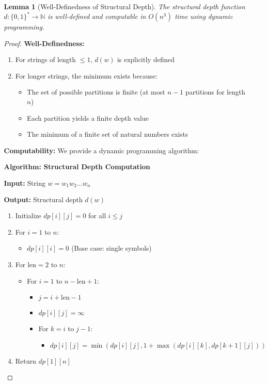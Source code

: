 \documentclass[11pt]{article}
\newtheorem{lemma}[theorem]{Lemma}
\theoremstyle{definition}
\begin{document}
\begin{lemma}[Well-Definedness of Structural Depth]
The structural depth function $d: \{0,1\}^* \to \mathbb{N}$ is well-defined and computable in $O(n^3)$ time using dynamic programming.
\end{lemma}

\begin{proof}
\textbf{Well-Definedness:}
\begin{enumerate}
\item For strings of length $\leq 1$, $d(w)$ is explicitly defined
\item For longer strings, the minimum exists because:
  \begin{itemize}
  \item The set of possible partitions is finite (at most $n-1$ partitions for length $n$)
  \item Each partition yields a finite depth value
  \item The minimum of a finite set of natural numbers exists
  \end{itemize}
\end{enumerate}

\textbf{Computability:}
We provide a dynamic programming algorithm:

\textbf{Algorithm: Structural Depth Computation}

\textbf{Input:} String $w = w_1w_2\ldots w_n$

\textbf{Output:} Structural depth $d(w)$

\begin{enumerate}
\item Initialize $dp[i][j] = 0$ for all $i \leq j$
\item For $i = 1$ to $n$:
   \begin{itemize}
   \item $dp[i][i] = 0$ (Base case: single symbols)
   \end{itemize}
\item For $\text{len} = 2$ to $n$:
   \begin{itemize}
   \item For $i = 1$ to $n-\text{len}+1$:
      \begin{itemize}
      \item $j = i + \text{len} - 1$
      \item $dp[i][j] = \infty$
      \item For $k = i$ to $j-1$:
         \begin{itemize}
         \item $dp[i][j] = \min(dp[i][j], 1 + \max(dp[i][k], dp[k+1][j]))$
         \end{itemize}
      \end{itemize}
   \end{itemize}
\item Return $dp[1][n]$
\end{enumerate}


\end{proof}
\end{document}
